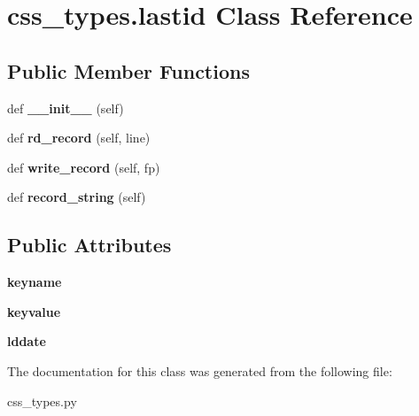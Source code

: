 \hypertarget{classcss__types_1_1lastid}{}\section{css\+\_\+types.\+lastid Class Reference}
\label{classcss__types_1_1lastid}
\subsection*{Public Member Functions}
\begin{DoxyCompactItemize}
\item 
\hypertarget{classcss__types_1_1lastid_a6d9cec15d995e6ebe3181f6323a6d184}{}def {\bfseries \+\_\+\+\_\+init\+\_\+\+\_\+} (self)\label{classcss__types_1_1lastid_a6d9cec15d995e6ebe3181f6323a6d184}

\item 
\hypertarget{classcss__types_1_1lastid_a9c7e0764a8a58779e1bac5a0261e0ead}{}def {\bfseries rd\+\_\+record} (self, line)\label{classcss__types_1_1lastid_a9c7e0764a8a58779e1bac5a0261e0ead}

\item 
\hypertarget{classcss__types_1_1lastid_a8002e2aad718e6cb1b8375fb625d51dd}{}def {\bfseries write\+\_\+record} (self, fp)\label{classcss__types_1_1lastid_a8002e2aad718e6cb1b8375fb625d51dd}

\item 
\hypertarget{classcss__types_1_1lastid_a4cfc55100577903b9f728fc11bd40e04}{}def {\bfseries record\+\_\+string} (self)\label{classcss__types_1_1lastid_a4cfc55100577903b9f728fc11bd40e04}

\end{DoxyCompactItemize}
\subsection*{Public Attributes}
\begin{DoxyCompactItemize}
\item 
\hypertarget{classcss__types_1_1lastid_a0ee3e9bbb032260044de6a803a3bfc5a}{}{\bfseries keyname}\label{classcss__types_1_1lastid_a0ee3e9bbb032260044de6a803a3bfc5a}

\item 
\hypertarget{classcss__types_1_1lastid_a6c2b4db80f76b1e150a3fc4f1fcaf763}{}{\bfseries keyvalue}\label{classcss__types_1_1lastid_a6c2b4db80f76b1e150a3fc4f1fcaf763}

\item 
\hypertarget{classcss__types_1_1lastid_af035357a03ff980fc958fc04257e1084}{}{\bfseries lddate}\label{classcss__types_1_1lastid_af035357a03ff980fc958fc04257e1084}

\end{DoxyCompactItemize}


The documentation for this class was generated from the following file\+:\begin{DoxyCompactItemize}
\item 
css\+\_\+types.\+py\end{DoxyCompactItemize}
